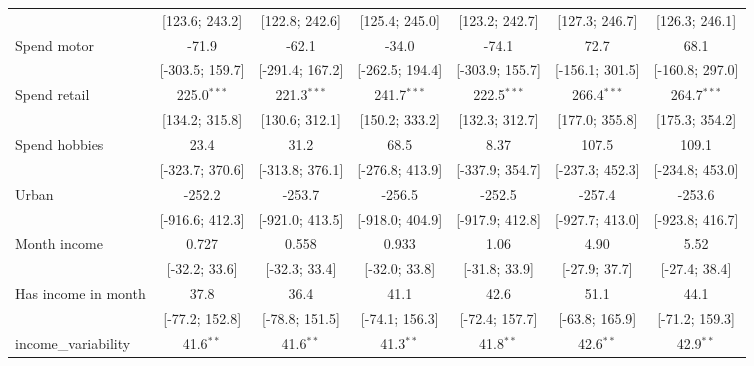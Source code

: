 \begin{table}[htbp]
\begin{threeparttable}[b]
\begin{tabular}{lcccccc}
                                   & [123.6; 243.2]   & [122.8; 242.6]   & [125.4; 245.0]   & [123.2; 242.7]   & [127.3; 246.7]   & [126.3; 246.1]\\   
         Spend motor               & -71.9            & -62.1            & -34.0            & -74.1            & 72.7             & 68.1\\   
                                   & [-303.5; 159.7]  & [-291.4; 167.2]  & [-262.5; 194.4]  & [-303.9; 155.7]  & [-156.1; 301.5]  & [-160.8; 297.0]\\   
         Spend retail              & 225.0$^{***}$    & 221.3$^{***}$    & 241.7$^{***}$    & 222.5$^{***}$    & 266.4$^{***}$    & 264.7$^{***}$\\   
                                   & [134.2; 315.8]   & [130.6; 312.1]   & [150.2; 333.2]   & [132.3; 312.7]   & [177.0; 355.8]   & [175.3; 354.2]\\   
         Spend hobbies             & 23.4             & 31.2             & 68.5             & 8.37             & 107.5            & 109.1\\   
                                   & [-323.7; 370.6]  & [-313.8; 376.1]  & [-276.8; 413.9]  & [-337.9; 354.7]  & [-237.3; 452.3]  & [-234.8; 453.0]\\   
         Urban                     & -252.2           & -253.7           & -256.5           & -252.5           & -257.4           & -253.6\\   
                                   & [-916.6; 412.3]  & [-921.0; 413.5]  & [-918.0; 404.9]  & [-917.9; 412.8]  & [-927.7; 413.0]  & [-923.8; 416.7]\\   
         Month income              & 0.727            & 0.558            & 0.933            & 1.06             & 4.90             & 5.52\\   
                                   & [-32.2; 33.6]    & [-32.3; 33.4]    & [-32.0; 33.8]    & [-31.8; 33.9]    & [-27.9; 37.7]    & [-27.4; 38.4]\\   
         Has income in month       & 37.8             & 36.4             & 41.1             & 42.6             & 51.1             & 44.1\\   
                                   & [-77.2; 152.8]   & [-78.8; 151.5]   & [-74.1; 156.3]   & [-72.4; 157.7]   & [-63.8; 165.9]   & [-71.2; 159.3]\\   
         income\_variability       & 41.6$^{**}$      & 41.6$^{**}$      & 41.3$^{**}$      & 41.8$^{**}$      & 42.6$^{**}$      & 42.9$^{**}$\\   

\end{tabular}
\end{threeparttable}
\end{table}
